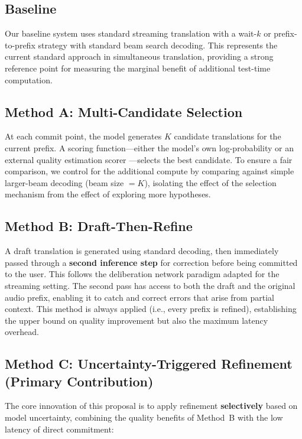 \subsection{Baseline}

Our baseline system uses standard streaming translation with a wait-$k$ or prefix-to-prefix strategy \citep{ma2019stacl} with standard beam search decoding. This represents the current standard approach in simultaneous translation, providing a strong reference point for measuring the marginal benefit of additional test-time computation.

\subsection{Method A: Multi-Candidate Selection}

At each commit point, the model generates $K$ candidate translations for the current prefix. A scoring function---either the model's own log-probability or an external quality estimation scorer \citep{fomicheva2020unsupervised}---selects the best candidate. To ensure a fair comparison, we control for the additional compute by comparing against simple larger-beam decoding (beam size $= K$), isolating the effect of the selection mechanism from the effect of exploring more hypotheses.

\subsection{Method B: Draft-Then-Refine}

A draft translation is generated using standard decoding, then immediately passed through a \textbf{second inference step} for correction before being committed to the user. This follows the deliberation network paradigm \citep{xia2017deliberation} adapted for the streaming setting. The second pass has access to both the draft and the original audio prefix, enabling it to catch and correct errors that arise from partial context. This method is always applied (i.e., every prefix is refined), establishing the upper bound on quality improvement but also the maximum latency overhead.

\subsection{Method C: Uncertainty-Triggered Refinement (Primary Contribution)}

The core innovation of this proposal is to apply refinement \textbf{selectively} based on model uncertainty, combining the quality benefits of Method~B with the low latency of direct commitment:

